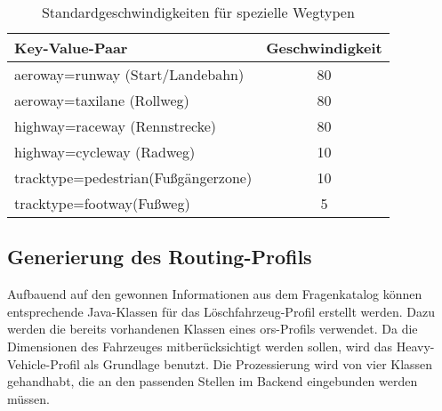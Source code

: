 \begin{table}
\caption{Standardgeschwindigkeiten für spezielle Wegtypen}
\label{tab:speedinfospecial}
\centering
\begin{tabular}{|l|c|}
\hline
\multicolumn{1}{|l|}{Key-Value-Paar} & \multicolumn{1}{c|}{Geschwindigkeit} \\
\hline
aeroway=runway (Start/Landebahn) & 80 \\
aeroway=taxilane (Rollweg) & 80 \\
highway=raceway (Rennstrecke) & 80 \\
highway=cycleway (Radweg) & 10 \\
tracktype=pedestrian(Fußgängerzone) & 10\\
tracktype=footway(Fußweg) & 5\\
\hline
\end{tabular}
\end{table}



\subsection{Generierung des Routing-Profils}
\label{backendGraphBuild}
Aufbauend auf den gewonnen Informationen aus dem Fragenkatalog können entsprechende Java-Klassen für das Löschfahrzeug-Profil erstellt werden.
Dazu werden die bereits vorhandenen Klassen eines \gls{ors}-Profils verwendet.
Da die Dimensionen des Fahrzeuges mitberücksichtigt werden sollen, wird das Heavy-Vehicle-Profil als Grundlage benutzt.
Die Prozessierung wird von vier Klassen gehandhabt, die an den passenden Stellen im Backend eingebunden werden müssen.


